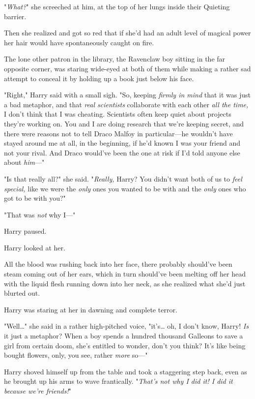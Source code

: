 "\emph{What?}" she screeched at him, at the top of her lungs inside their
Quieting barrier.

Then she realized and got so red that if she'd had an adult level of magical
power her hair would have spontaneously caught on fire.

The lone other patron in the library, the Ravenclaw boy sitting in the far
opposite corner, was staring wide-eyed at both of them while making a rather
sad attempt to conceal it by holding up a book just below his face.

"Right," Harry said with a small sigh. "So, keeping \emph{firmly in mind} that
it was just a bad metaphor, and that \emph{real scientists} collaborate with
each other \emph{all the time,} I don't think that I was cheating. Scientists
often keep quiet about projects they're working on. You and I are doing
research that we're keeping secret, and there were reasons not to tell Draco
Malfoy in particular---he wouldn't have stayed around me at all, in the
beginning, if he'd known I was your friend and not your rival. And Draco
would've been the one at risk if I'd told anyone else about \emph{him}---"

"Is that really all?" she said. "\emph{Really,} Harry? You didn't want both of
us to \emph{feel special,} like we were the \emph{only} ones you wanted to be
with and the \emph{only} ones who got to be with you?"

"That was \emph{not} why I---"

Harry paused.

Harry looked at her.

All the blood was rushing back into her face, there probably should've been
steam coming out of her ears, which in turn should've been melting off her head
with the liquid flesh running down into her neck, as she realized what she'd
just blurted out.

Harry was staring at her in dawning and complete terror.

"Well{\ldots}" she said in a rather high-pitched voice, "it's{\ldots} oh, I
don't know, Harry! \emph{Is} it just a metaphor? When a boy spends a hundred
thousand Galleons to save a girl from certain doom, she's entitled to wonder,
don't you think? It's like being bought flowers, only, you see, rather
\emph{more} so---"

Harry shoved himself up from the table and took a staggering step back, even as
he brought up his arms to wave frantically. "\emph{That's not why I did it! I
did it because we're friends!}"

